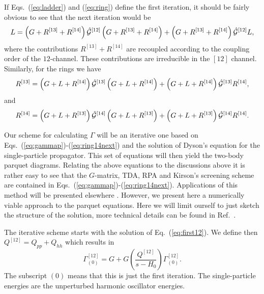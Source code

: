 \documentclass{article}
\begin{document}
If Eqs.\ (\ref{eq:ladder}) and (\ref{eq:ring}) define the first iteration,
it should be fairly obvious to see that the next iteration would be
\begin{equation}
    L=\left(G+R^{[13]}+R^{[14]}\right)\hat{{\cal G}}^{[12]}\left(G+R^{[13]}+R^{[14]}\right)
      +\left(G+R^{[13]}+R^{[14]}\right)\hat{{\cal G}}^{[12]}L,
    \label{eq:laddernext}
\end{equation}
where the contributions $R^{[13]}+R^{[14]} $ are recoupled according to the coupling order
of the $12$-channel. These contributions are irreducible in the $[12]$ channel.
Similarly, for the rings we have
\begin{equation}
    R^{[13]}=\left(G+L+R^{[14]}\right)\hat{{\cal G}}^{[13]}
             \left(G+L+R^{[14]}\right) +
             \left(G+L+R^{[14]}\right)\hat{{\cal G}}^{[13]}R^{[14]},
    \label{eq:ring13next}
\end{equation}
and
\begin{equation}
    R^{[14]}=\left(G+L+R^{[13]}\right)\hat{{\cal G}}^{[14]}
             \left(G+L+R^{[13]}\right) +
             \left(G+L+R^{[13]}\right)\hat{{\cal G}}^{[14]}R^{[14]}.
    \label{eq:ring14next}
\end{equation}


Our scheme for calculating $\Gamma$ will be an iterative one based on
Eqs.\ (\ref{eq:gammap})-(\ref{eq:ring14next})
and the solution of Dyson's equation
for the single-particle propagator. This set of equations will then yield
the two-body parquet diagrams.
Relating the above equations to the discussions above it is rather easy to see
that the $G$-matrix, TDA, RPA and Kirson's
screening scheme are contained in Eqs.\
(\ref{eq:gammap})-(\ref{eq:ring14next}).
Applications of this method will be presented elsewhere \cite{mhj99}. However, we present
here a numerically viable approach
to the parquet equations.
Here
we will limit ourself to just sketch 
the structure of the solution, more technical details 
can be found in Ref.~\cite{mhj99}.

The iterative scheme starts with the solution of Eq.\ (\ref{eq:first12}).
We define then $Q^{[12]}=Q_{pp}+Q_{hh}$ which results in 
\begin{equation}
   \Gamma^{[12]}_{(0)}=G+G\left(\frac{Q^{[12]}}{s-H_0}\right)\Gamma^{[12]}_{(0)}.
   \label{eq:approx12channel}
\end{equation}
The subscript $(0)$ means that this is just the first iteration.
The single-particle energies are the unperturbed
harmonic oscillator energies.  
\end{document}
